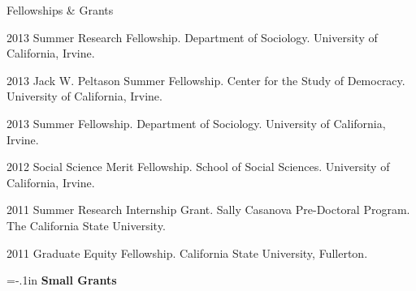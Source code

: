 \begin{rSection}{Fellowships \& Grants}
\begin{hangt}{2013 \datefill}
Summer Research Fellowship. Department of Sociology. University of California, Irvine. %
\end{hangt}
\begin{hangt}{2013 \datefill}
Jack W. Peltason Summer Fellowship. Center for the Study of Democracy. University of California, Irvine. %
\end{hangt}
\begin{hangt}{2013 \datefill}
Summer Fellowship. Department of Sociology. University of California, Irvine. %
\end{hangt}
\begin{hangt}{2012 \datefill}
Social Science Merit Fellowship. School of Social Sciences. University of California, Irvine. %
\end{hangt}
\begin{hangt}{2011 \datefill}
Summer Research Internship Grant. Sally Casanova Pre-Doctoral Program. The California State University. %
\end{hangt}
\begin{hangt}{2011 \datefill}
Graduate Equity Fellowship. California State University, Fullerton. 
\end{hangt}




{\parindent=-.1in {\bf Small Grants}}


\end{rSection}
